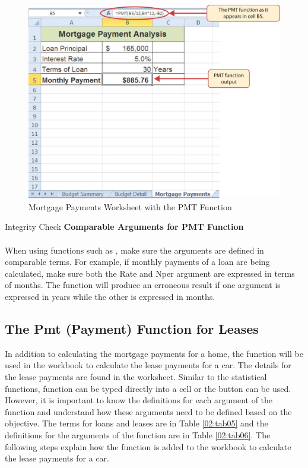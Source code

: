 \begin{figure}[H]
	\centering
	\includegraphics[width=\maxwidth{.95\linewidth}]{gfx/ch02_fig33}
	\caption{Mortgage Payments Worksheet with the PMT Function}
	\label{02:fig33}
\end{figure}

\begin{center}
	\begin{infobox}{Integrity Check}
		\textbf{Comparable Arguments for PMT Function}
		\\
		\\
		When using functions such as , make sure the arguments are defined in comparable terms. For example, if monthly payments of a loan are being calculated, make sure both the Rate and Nper argument are expressed in terms of months. The function will produce an erroneous result if one argument is expressed in years while the other is expressed in months.
	\end{infobox}
\end{center}

\subsection{The Pmt (Payment) Function for Leases}

In addition to calculating the mortgage payments for a home, the  function will be used in the  workbook to calculate the lease payments for a car. The details for the lease payments are found in the  worksheet. Similar to the statistical functions,  function can be typed directly into a cell or the  button can be used. However, it is important to know the definitions for each argument of the function and understand how these arguments need to be defined based on the objective. The terms for loans and leases are in Table \ref{02:tab05} and the definitions for the arguments of the  function are in Table \ref{02:tab06}. The following steps explain how the  function is added to the  workbook to calculate the lease payments for a car.

